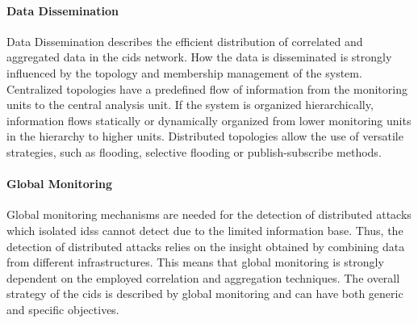 \paragraph{Data Dissemination}\label{par:data dissemniation} Data Dissemination describes the efficient distribution of correlated and aggregated data in the \acrshort{cids} network. How the data is disseminated is strongly influenced by the topology and membership management of the system. Centralized topologies have a predefined flow of information from the monitoring units to the central analysis unit. If the system is organized hierarchically, information flows statically or dynamically organized from lower monitoring units in the hierarchy to higher units. Distributed topologies allow the use of versatile strategies, such as flooding, selective flooding or publish-subscribe methods.

\paragraph{Global Monitoring}\label{par:global_monitoring} Global monitoring mechanisms are needed for the detection of distributed attacks which isolated \acrshort{ids}s cannot detect due to the limited information base. Thus, the detection of distributed attacks relies on the insight obtained by combining data from different infrastructures. This means that global monitoring is strongly dependent on the employed correlation and aggregation techniques. The overall strategy of the \acrshort{cids} is described by global monitoring and can have both generic and specific objectives. 




